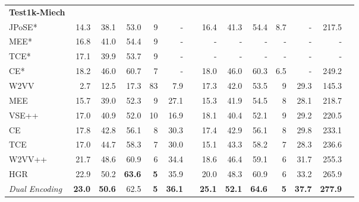 \begin{table*} [tb!]
{\begin{tabular}{@{}l*{12}{r}c @{}}
\hline
\textbf{Test1k-Miech \cite{miech2018learning}}  \\
JPoSE*  \cite{wray2019fine}                & 14.3 & 38.1 & 53.0 & 9 & - && 16.4 & 41.3 & 54.4 & 8.7 & - & 217.5 \\
MEE* \cite{miech2018learning}               & 16.8 & 41.0 & 54.4 & 9 & - && - & - & - & - & - & -  \\
TCE* \cite{sigir2020tree}                  & 17.1 & 39.9 & 53.7 & 9 & - && - & - & - & - & - & -  \\
CE* \cite{liu2019use}                      & 18.2 & 46.0 & 60.7 & 7 & - && 18.0 & 46.0  & 60.3 & 6.5 & - & 249.2 \\
\cmidrule{2-13}
W2VV \cite{dong2018predicting}            & 2.7 & 12.5 & 17.3 & 83 & 7.9 &&      17.3 & 42.0 & 53.5 & 9 & 29.3 & 145.3 \\
MEE \cite{miech2018learning}             & 15.7 & 39.0 & 52.3 & 9 & 27.1  && 15.3 & 41.9 & 54.5& 8 & 28.1 & 218.7 \\
VSE++ \cite{faghri2017vse}               & 17.0 & 40.9 & 52.0 & 10 & 16.9 &&     18.1 & 40.4 & 52.1 & 9 & 29.2 & 220.5 \\
CE \cite{liu2019use}                     & 17.8 & 42.8 & 56.1 & 8 & 30.3  &&   17.4 & 42.9 & 56.1 & 8 & 29.8 & 233.1 \\
TCE \cite{sigir2020tree}                 & 17.0 & 44.7 & 58.3 & 7 & 30.0  &&   15.1 & 43.3 & 58.2 & 7 & 28.3 & 236.6 \\
W2VV++ \cite{li2019w2vv++}               & 21.7 & 48.6 & 60.9 & 6 & 34.4 &&    18.6 & 46.4 & 59.1 & 6 & 31.7 & 255.3 \\
HGR \cite{chen2020fine}                  & 22.9 & 50.2 & \textbf{63.6} & \textbf{5} & 35.9  &&   20.0 & 48.3 & 60.9 & 6 & 33.2 & 265.9 \\
\textit{Dual Encoding}         & \textbf{23.0} & \textbf{50.6} & 62.5 & \textbf{5} & \textbf{36.1} && \textbf{25.1} & \textbf{52.1} & \textbf{64.6} & \textbf{5} & \textbf{37.7} & \textbf{277.9} \\ [3pt]




\end{tabular}}
\end{table*}
